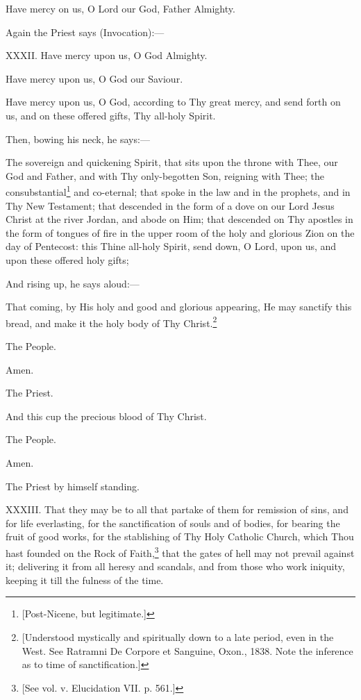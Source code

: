 Have mercy on us, O Lord our God, Father Almighty.

Again the Priest says (Invocation):—

XXXII. Have mercy upon us, O God Almighty.

Have mercy upon us, O God our Saviour.

Have mercy upon us, O God, according to Thy great mercy, and send forth on us, and on these offered gifts, Thy all-holy Spirit.

Then, bowing his neck, he says:—

The sovereign and quickening Spirit, that sits upon the throne with Thee, our God and Father, and with Thy only-begotten Son, reigning with Thee; the consubstantial\footnote{\par{}  [Post-Nicene, but legitimate.]} and co-eternal; that spoke in the law and in the prophets, and in Thy New Testament; that descended in the form of a dove on our Lord Jesus Christ at the river Jordan, and abode on Him; that descended on Thy apostles in the form of tongues of fire in the upper room of the holy and glorious Zion on the day of Pentecost: this Thine all-holy Spirit, send down, O Lord, upon us, and upon these offered holy gifts;

And rising up, he says aloud:—

That coming, by His holy and good and glorious appearing, He may sanctify this bread, and make it the holy body of Thy Christ.\footnote{\par{}  [Understood mystically and spiritually down to a late period, even in the West. See Ratramni De Corpore et Sanguine, Oxon., 1838. Note the inference as to time of sanctification.]}

The People.

Amen.

The Priest.

And this cup the precious blood of Thy Christ.

The People.

Amen.

The Priest by himself standing.

XXXIII. That they may be to all that partake of them for remission of sins, and for life everlasting, for the sanctification of souls and of bodies, for bearing the fruit of good works, for the stablishing of Thy Holy Catholic Church, which Thou hast founded on the Rock of Faith,\footnote{\par{}  [See vol. v. Elucidation VII. p. 561.]} that the gates of hell may not prevail against it; delivering it from all heresy and scandals, and from those who work iniquity, keeping it till the fulness of the time.

